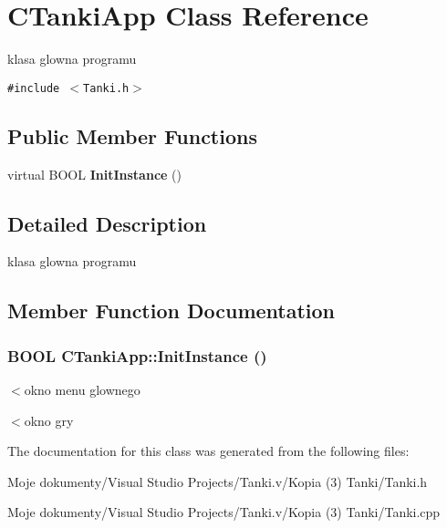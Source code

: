 \section{CTankiApp Class Reference}
\label{class_c_tanki_app}
klasa glowna programu  


{\tt \#include $<$Tanki.h$>$}

\subsection*{Public Member Functions}
\begin{CompactItemize}
\item 
virtual BOOL {\bf InitInstance} ()
\end{CompactItemize}


\subsection{Detailed Description}
klasa glowna programu 



\subsection{Member Function Documentation}
\subsubsection{\setlength{\rightskip}{0pt plus 5cm}BOOL CTankiApp::InitInstance ()\hspace{0.3cm}{\tt  [virtual]}}\label{class_c_tanki_app_7b7a29793cae5188b9e8be196ded8820}




$<$okno menu glownego

$<$okno gry 

The documentation for this class was generated from the following files:\begin{CompactItemize}
\item 
Moje dokumenty/Visual Studio Projects/Tanki.v/Kopia (3) Tanki/Tanki.h\item 
Moje dokumenty/Visual Studio Projects/Tanki.v/Kopia (3) Tanki/Tanki.cpp\end{CompactItemize}
